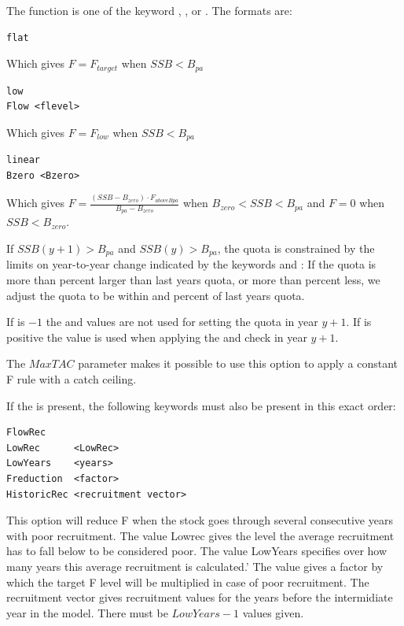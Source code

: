 \documentclass[12pt,twoside,a4paper]{article}
\begin{document}
The  function is one of the keyword ,
, or . The formats are:

\begin{verbatim}
flat
\end{verbatim}
Which gives $F=F_{target}$ when $SSB<B_{pa}$

\begin{verbatim}
low
Flow <flevel>
\end{verbatim}
Which gives $F=F_{low}$ when $SSB<B_{pa}$

\begin{verbatim}
linear
Bzero <Bzero>
\end{verbatim}
Which gives $F=\frac{(SSB-B_{zero})\cdot F_{aboveBpa}}{B_{pa}-B_{zero}}$ 
when $B_{zero} < SSB<B_{pa}$ and $F=0$ when $SSB<B_{zero}$.

If $SSB(y+1)>B_{pa}$ and $SSB(y)>B_{pa}$, the quota is constrained by the limits
on year-to-year change indicated by the keywords  and :
If the quota is more than  percent larger than last years
quota, or more than  percent less, we adjust the quota
to be within  and  percent of last
years quota.   

If  is $-1$ the  and 
 values are not used for setting the quota in year $y+1$. If  is positive
the value is used when applying the  and  check in year $y+1$.

The $MaxTAC$ parameter makes it possible to 
use this option to apply a constant F rule with a catch ceiling.

If the  is present, the following keywords must also be present in this exact order:
\begin{verbatim}
FlowRec
LowRec      <LowRec>
LowYears    <years>
Freduction  <factor>
HistoricRec <recruitment vector>
\end{verbatim}
This option will reduce F when the stock goes through several consecutive years with poor recruitment.
The value Lowrec gives the level the average recruitment has to fall below to be considered poor. 
The value LowYears specifies over how many years this average recruitment is calculated.’
The value  gives a factor by which the target F level will be multiplied in case of 
poor recruitment.
The recruitment vector gives recruitment values for the years before the intermidiate year in the model.
There must be $LowYears-1$ values given.
\end{document}
